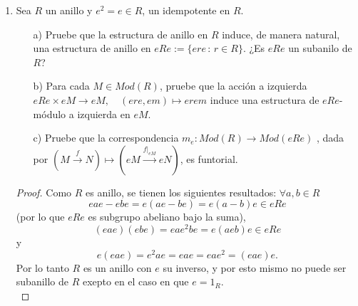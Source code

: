 \documentclass{article}
\newcommand{\lrprth}[1]{
	\left(#1\right)
}
\newcommand{\ringmodhom}[3]{
	Hom_{#1}\lrprth{#2,#3}
}
\theoremstyle{definition}
\theoremstyle{plain}
\theoremstyle{plain}
\theoremstyle{definition}
\theoremstyle{definition}
\theoremstyle{definition}
\theoremstyle{definition}
\theoremstyle{definition}
\theoremstyle{definition}
\begin{document}
\begin{enumerate}[label=\textbf{Ej \arabic*.}]
\begin{proof}
	$\boxed{\text{(b)}}$ De manera análoga al inciso anterior, podemos probar este inciso, por lo cual nos centraremos más en las cuentas. Bajo este contexto, tenemos que:
	\begin{itemize}
		\item Sean $m \in M$ y $s,u \in S$.
		\begin{align*}
			\rho\lrprth{m}\lrprth{su}=m\lrprth{su}\\
			=\lrprth{ms}u\\
			=\rho\lrprth{m}\lrprth{s}u
		\end{align*}
		\item Sean $m,n \in M$ y $s \in S$.
		\begin{align*}
			\rho\lrprth{m+n}\lrprth{s}=\lrprth{m+n}s\\
			=ms+ns\\
			=\rho\lrprth{m}\lrprth{s}+\rho\lrprth{n}\lrprth{s}
		\end{align*}
		\item Sean $m \in M$ y $s,u \in S$
		\begin{align*}
			\rho\lrprth{m}\lrprth{su}=m\lrprth{su}\\
			=\lrprth{ms}u\\
			=\rho\lrprth{m}\lrprth{s}u
		\end{align*}
	\end{itemize}
	
	Así mismo, $\rho$ es un isomorfismo. En efecto, si $x \in Ker\lrprth{ \rho }$, entonces $\rho \lrprth{x}=0$; de donde $x=0$. Más aún, si $g \in \ringmodhom{S}{S}{M}$, entonces $\rho \lrprth{g\lrprth{1}}=g$.\\
	$\therefore\rho$ es un isomorfismo.\\
\end{proof}
\item Sea $R$ un anillo y $e^2=e\in R$, un idempotente en $R$.
\begin{itemize}
	\item[a)] Pruebe que la estructura de anillo en $R$ induce, de manera natural, una estructura de anillo en $eRe:=\{ere\,\colon\,r\in R\}$.
	¿Es $eRe$ un subanilo de $R$?
	\item[b)] Para cada $M\in Mod(R)$, pruebe que la acción a izquierda \\
	$eRe\times eM\longrightarrow eM,$ \,\, $(ere,em)\mapsto erem$ 
	induce una estructura de $eRe$-módulo a izquierda en $eM$.
	\item[c)] Pruebe que la correspondencia $m_e:Mod(R)\longrightarrow Mod(eRe)$ , dada por 
	$\left(M \stackrel{f}{\longrightarrow} N\right)\longmapsto \left(eM\stackrel{f|_{eM}}{\longrightarrow} eN\right)$, es funtorial.
\end{itemize}
\begin{proof}
	 Como $R$ es anillo, se tienen los siguientes resultados: $\forall a,b\in R$
	\[eae-ebe=e(ae-be)=e(a-b)e\in eRe\]
	(por lo que $eRe$ es subgrupo abeliano bajo la suma),
	\[(eae)(ebe)=eae^2be=e(aeb)e\in eRe
	\]
	y 
	\[e(eae)=e^2ae=eae=eae^2=(eae)e.
	\]
	Por lo tanto $R$ es un anillo con $e$ su inverso, y por esto mismo no puede ser subanillo de $R$ exepto en el caso en que $e=1_R$. \\
	

\end{proof}
\end{enumerate}
\end{document}
